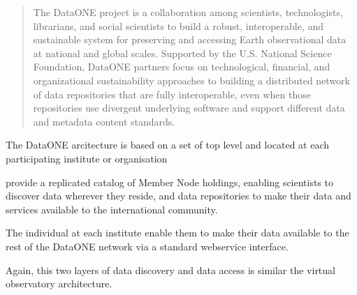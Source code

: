 \documentclass{article}
\begin{document}
\begin{quote}
The DataONE project is a collaboration among scientists, technologists,
librarians, and social scientists to build a robust, interoperable, and
sustainable system for preserving and accessing Earth observational data at
national and global scales. Supported by the U.S. National Science Foundation,
DataONE partners focus on technological, financial, and organizational
sustainability approaches to building a distributed network of data repositories
that are fully interoperable, even when those repositories use divergent
underlying software and support different data and metadata content standards.
\end{quote}

The DataONE arcitecture is based on a set of top level 
and
located at each participating institute or organisation

provide a replicated catalog of Member Node holdings, enabling
scientists to discover data wherever they reside,
and data repositories to make their data and services available
to the international community.

The individual 
at each institute enable them to make their data available
to the rest of the DataONE network
via a standard webservice interface.

Again, this two layers of data discovery and data access
is similar the virtual observatory architecture.










 


















\theendnotes
\end{document}
